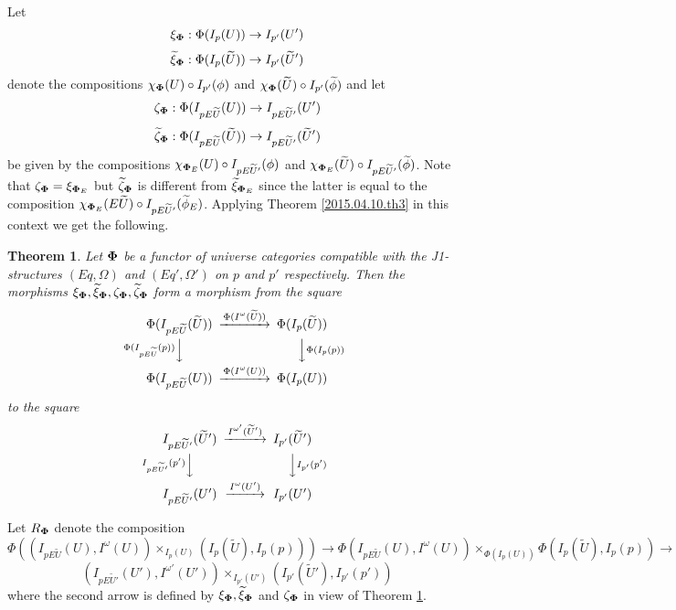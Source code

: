 \documentclass[12pt]{article}
\newtheorem{theorem}[proposition]{Theorem}
\newcommand{\llabel}[1]{\label{#1}}
\newcommand{\sr}{\rightarrow}
\newcommand{\wt}{\widetilde}
\begin{document}
Let 
%
$$\xi_{\bf\Phi}:\Phi(I_p(U))\sr I_{p'}(U')$$
$$\wt{\xi}_{\bf\Phi}:\Phi(I_p(\wt{U}))\sr I_{p'}(\wt{U}')$$
%
denote the compositions $\chi_{\bf\Phi}(U)\circ I_{p'}(\phi)$ and $\chi_{\bf\Phi}(\wt{U})\circ I_{p'}(\wt{\phi})$ and let 
%
$$\zeta_{\bf\Phi}:\Phi(I_{pE\wt{U}}(U))\sr I_{pE\wt{U}'}(U')$$
$$\wt{\zeta}_{\bf\Phi}:\Phi(I_{pE\wt{U}}(\wt{U}))\sr I_{pE\wt{U}'}(\wt{U}')$$
%
be given by the compositions $\chi_{{\bf\Phi}_{E}}(U)\circ I_{pE\wt{U}'}(\phi)$ and $\chi_{{\bf\Phi}_{E}}(\wt{U})\circ I_{pE\wt{U}'}(\wt{\phi})$. Note that $\zeta_{\bf\Phi}=\xi_{{\bf\Phi}_{E}}$ but $\wt{\zeta}_{\bf\Phi}$ is different from $\wt{\xi}_{{\bf\Phi}_{E}}$ since the latter is equal to the composition $\chi_{{\bf\Phi}_{E}}(E\wt{U})\circ I_{pE\wt{U}'}(\wt{\phi}_{E})$. Applying Theorem \ref{2015.04.10.th3} in this context we get the following. 
%
\begin{theorem}
\llabel{2015.04.10.th1}
Let ${\bf\Phi}$ be a functor of universe categories compatible with the J1-structures $(Eq,\Omega)$ and $(Eq',\Omega')$ on $p$ and $p'$ respectively. Then the morphisms $\xi_{\bf\Phi}, \wt{\xi}_{\bf\Phi}, \zeta_{\bf\Phi}, \wt{\zeta}_{\bf\Phi}$ form a morphism from the square
%
$$
\begin{CD}
\Phi(I_{pE\wt{U}}(\wt{U})) @>\Phi(I^{\omega}(\wt{U}))>> \Phi(I_p(\wt{U}))\\
@V\Phi(I_{pE\wt{U}}(p))VV @VV\Phi(I_p(p))V\\
\Phi(I_{pE\wt{U}}(U)) @>\Phi(I^{\omega}(U))>> \Phi(I_p(U))
\end{CD}
$$
%
to the square
%
$$
\begin{CD}
I_{pE\wt{U}'}(\wt{U}') @>I^{\omega'}(\wt{U}')>> I_{p'}(\wt{U}')\\
@VI_{pE\wt{U}'}(p')VV @VVI_{p'}(p')V\\
I_{pE\wt{U}'}(U') @>I^{\omega}(U')>> I_{p'}(U')
\end{CD}
$$
%
\end{theorem}
%
Let $R_{\bf\Phi}$ denote the composition
%
$$\Phi((I_{pE\wt{U}}(U), I^{\omega}(U))\times_{I_p(U)} (I_p(\wt{U}), I_p(p)))\sr \Phi(I_{pE\wt{U}}(U), I^{\omega}(U))\times_{\Phi(I_p(U))}\Phi(I_p(\wt{U}), I_p(p))\sr$$
$$(I_{pE\wt{U}'}(U'),I^{\omega'}(U'))\times_{I_{p'}(U')}(I_{p'}(\wt{U}'),I_{p'}(p'))$$
%
where the second arrow is defined by $\xi_{\bf\Phi}, \wt{\xi}_{\bf\Phi}$ and  $\zeta_{\bf\Phi}$ in view of Theorem \ref{2015.04.10.th1}. 
%
\end{document}
